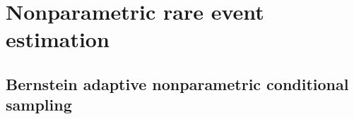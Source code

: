 \chapter{Nonparametric rare event estimation}

\section{Bernstein adaptive nonparametric conditional sampling}

